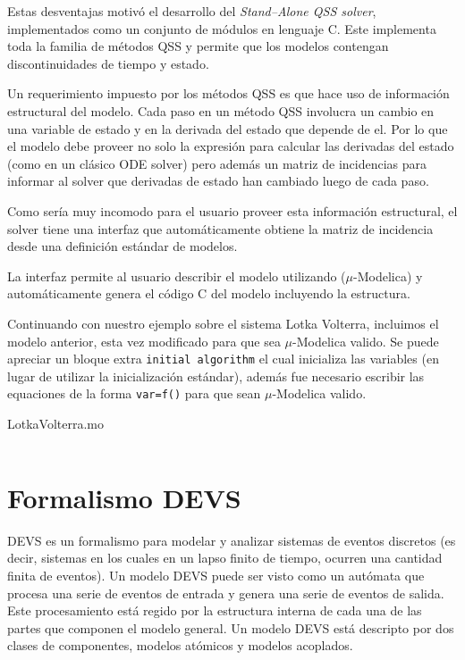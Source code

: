 	Estas desventajas motivó el desarrollo del \emph{Stand–Alone QSS solver}\cite{Ber12}, implementados como un conjunto de módulos en lenguaje C. Este implementa 
	toda la familia de métodos QSS y permite que los modelos contengan discontinuidades de tiempo y estado.

	Un requerimiento impuesto por los métodos QSS es que hace uso de información estructural del modelo. Cada paso en un método QSS involucra un cambio 
	en una variable de estado y en la derivada del estado que depende de el. Por lo que el modelo debe proveer no solo la expresión para calcular las 
	derivadas del estado (como en un clásico ODE solver) pero además un matriz de incidencias para informar al solver que derivadas de estado han cambiado 
	luego de cada paso.

	Como sería muy incomodo para el usuario proveer esta información estructural, el solver tiene una interfaz que automáticamente obtiene la matriz de
	 incidencia desde una definición estándar de modelos.

	La interfaz permite al usuario describir el modelo utilizando ($\mu$-Modelica) y automáticamente genera el código C del modelo incluyendo la estructura.

	Continuando con nuestro ejemplo sobre el sistema Lotka Volterra, incluimos el modelo anterior, esta vez modificado para que sea $\mu$-Modelica valido.
	Se puede apreciar un bloque extra \texttt{initial algorithm} el cual inicializa las variables (en lugar de utilizar la inicialización estándar), además 
	fue necesario escribir las equaciones de la forma \texttt{var=f()} para que sean $\mu$-Modelica valido.

	\begin{listing}[H]    
		\caption{LotkaVolterra.mo}
		\inputminted[linenos]{modelica}{src/lotka_volterra_qss.mo}
		\label{lst:LotkaVolterra.mo}
	\end{listing} 

\section{Formalismo DEVS}
	DEVS\cite{Zeigler} es un formalismo para modelar y analizar sistemas de eventos discretos (es decir, sistemas en los cuales en un lapso finito de tiempo, 
	ocurren una cantidad finita de eventos).
	Un modelo DEVS puede ser visto como un autómata que procesa una serie de eventos de entrada y genera una serie de eventos de salida. 
	Este procesamiento está regido por la estructura interna de cada una de las partes que componen el modelo general.
	Un modelo DEVS está descripto por dos clases de componentes, modelos atómicos y modelos acoplados.

